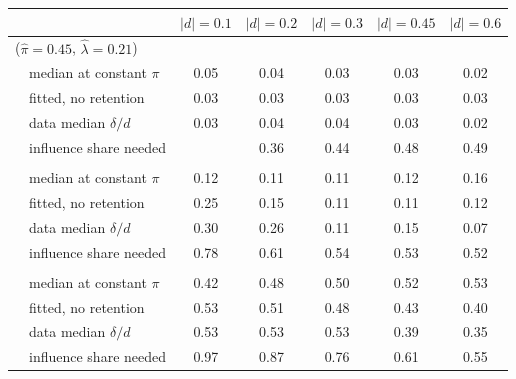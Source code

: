\begin{tabular}{llccccc}
\toprule
 &  & $|d|=0.1$ & $|d|=0.2$ & $|d|=0.3$ & $|d|=0.45$ & $|d|=0.6$ \\
\midrule
\multicolumn{7}{l}{\adamsLo{} ($\hat\pi=0.45$, $\hat\lambda=0.21$)} \\
 & median at constant $\pi$ & 0.05 & 0.04 & 0.03 & 0.03 & 0.02 \\
 & fitted, no retention & 0.03 & 0.03 & 0.03 & 0.03 & 0.03 \\
 & data median $\delta/d$ & 0.03 & 0.04 & 0.04 & 0.03 & 0.02 \\
 & influence share needed &  & 0.36 & 0.44 & 0.48 & 0.49 \\
\addlinespace
\multicolumn{7}{l}{\adamsMid{} ($\hat\pi=0.54$, $\hat\lambda=0.41$)} \\
 & median at constant $\pi$ & 0.12 & 0.11 & 0.11 & 0.12 & 0.16 \\
 & fitted, no retention & 0.25 & 0.15 & 0.11 & 0.11 & 0.12 \\
 & data median $\delta/d$ & 0.30 & 0.26 & 0.11 & 0.15 & 0.07 \\
 & influence share needed & 0.78 & 0.61 & 0.54 & 0.53 & 0.52 \\
\addlinespace
\multicolumn{7}{l}{\adamsHi{} ($\hat\pi=0.81$, $\hat\lambda=0.55$)} \\
 & median at constant $\pi$ & 0.42 & 0.48 & 0.50 & 0.52 & 0.53 \\
 & fitted, no retention & 0.53 & 0.51 & 0.48 & 0.43 & 0.40 \\
 & data median $\delta/d$ & 0.53 & 0.53 & 0.53 & 0.39 & 0.35 \\
 & influence share needed & 0.97 & 0.87 & 0.76 & 0.61 & 0.55 \\
\bottomrule
\end{tabular}
